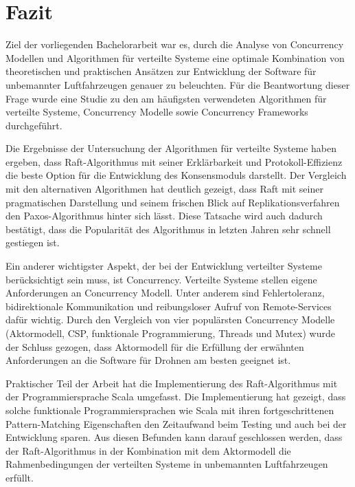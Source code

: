 \chapter{Fazit}
\label{cha:Fazit}

Ziel der vorliegenden Bachelorarbeit war es, durch die Analyse von Concurrency Modellen und Algorithmen für verteilte Systeme eine optimale Kombination von theoretischen und praktischen Ansätzen zur Entwicklung der Software für unbemannter Luftfahrzeugen genauer zu beleuchten. Für die Beantwortung dieser Frage wurde eine Studie zu den am häufigsten verwendeten Algorithmen für verteilte Systeme, Concurrency Modelle sowie Concurrency Frameworks durchgeführt.

Die Ergebnisse der Untersuchung der Algorithmen für verteilte Systeme haben ergeben, dass Raft-Algorithmus mit seiner Erklärbarkeit und Protokoll-Effizienz die beste Option für die Entwicklung des Konsensmoduls darstellt. Der Vergleich mit den alternativen Algorithmen hat deutlich gezeigt, dass Raft mit seiner pragmatischen Darstellung und seinem frischen Blick auf Replikationsverfahren den Paxos-Algorithmus hinter sich lässt. Diese Tatsache wird auch dadurch bestätigt, dass die Popularität des Algorithmus in letzten Jahren sehr schnell gestiegen ist.

Ein anderer wichtigster Aspekt, der bei der Entwicklung verteilter Systeme berücksichtigt sein muss, ist Concurrency. Verteilte Systeme stellen eigene Anforderungen an Concurrency Modell. Unter anderem sind Fehlertoleranz, bidirektionale Kommunikation und reibungsloser Aufruf von Remote-Services dafür wichtig. Durch den Vergleich von vier populärsten Concurrency Modelle (Aktormodell, CSP, funktionale Programmierung, Threads und Mutex) wurde der Schluss gezogen, dass Aktormodell für die Erfüllung der erwähnten Anforderungen an die Software für Drohnen am besten geeignet ist. 

Praktischer Teil der Arbeit hat die Implementierung des Raft-Algorithmus mit der Programmiersprache Scala umgefasst. Die Implementierung hat gezeigt, dass solche funktionale Programmiersprachen wie Scala mit ihren fortgeschrittenen Pattern-Matching Eigenschaften den Zeitaufwand beim Testing und auch bei der Entwicklung sparen. Aus diesen Befunden kann darauf geschlossen werden, dass der Raft-Algorithmus in der Kombination mit dem Aktormodell die Rahmenbedingungen der verteilten Systeme in unbemannten Luftfahrzeugen erfüllt. 
